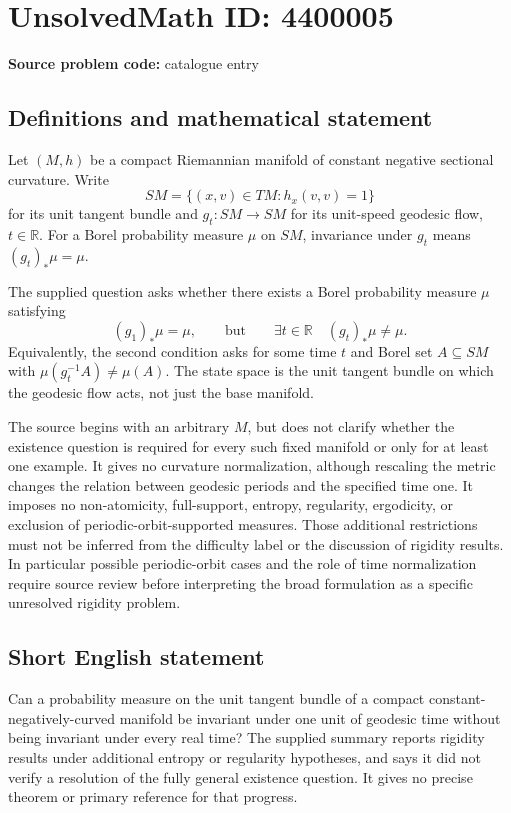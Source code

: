 \documentclass[11pt]{article}
\newcommand{\R}{\mathbb{R}}
\begin{document}
\section*{UnsolvedMath ID: 4400005}
\textbf{Source problem code:} catalogue entry
\subsection{Definitions and mathematical statement}
Let $(M,h)$ be a compact Riemannian manifold of constant negative sectional curvature. Write
\[
 SM=\{(x,v)\in TM:h_x(v,v)=1\}
\]
for its unit tangent bundle and $g_t:SM\to SM$ for its unit-speed geodesic flow, $t\in\R$. For a Borel probability measure $\mu$ on $SM$, invariance under $g_t$ means $(g_t)_*\mu=\mu$.

The supplied question asks whether there exists a Borel probability measure $\mu$ satisfying
\[
 (g_1)_*\mu=\mu,
 \qquad\text{but}\qquad
 \exists t\in\R\quad(g_t)_*\mu\ne\mu.
\]
Equivalently, the second condition asks for some time $t$ and Borel set $A\subseteq SM$ with $\mu(g_t^{-1}A)\ne\mu(A)$. The state space is the unit tangent bundle on which the geodesic flow acts, not just the base manifold.

The source begins with an arbitrary $M$, but does not clarify whether the existence question is required for every such fixed manifold or only for at least one example. It gives no curvature normalization, although rescaling the metric changes the relation between geodesic periods and the specified time one. It imposes no non-atomicity, full-support, entropy, regularity, ergodicity, or exclusion of periodic-orbit-supported measures. Those additional restrictions must not be inferred from the difficulty label or the discussion of rigidity results. In particular possible periodic-orbit cases and the role of time normalization require source review before interpreting the broad formulation as a specific unresolved rigidity problem.
\subsection{Short English statement}
Can a probability measure on the unit tangent bundle of a compact constant-negatively-curved manifold be invariant under one unit of geodesic time without being invariant under every real time? The supplied summary reports rigidity results under additional entropy or regularity hypotheses, and says it did not verify a resolution of the fully general existence question. It gives no precise theorem or primary reference for that progress.
\end{document}
